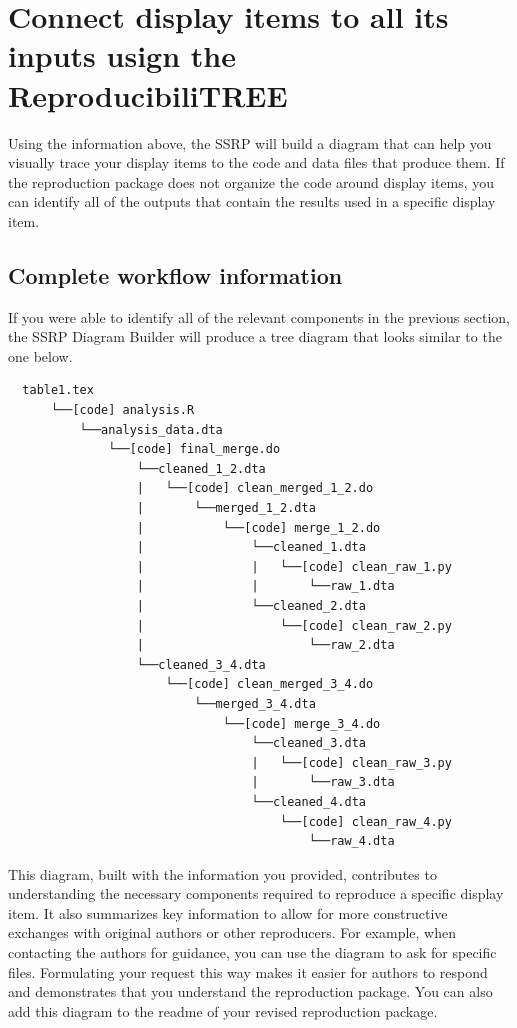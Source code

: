 \documentclass[
]{book}
\begin{document}
\hypertarget{diagram}{%
\section{Connect display items to all its inputs usign the ReproducibiliTREE}\label{diagram}}

Using the information above, the SSRP will build a diagram that can help you visually trace your display items to the code and data files that produce them. If the reproduction package does not organize the code around display items, you can identify all of the outputs that contain the results used in a specific display item.

\hypertarget{complete-tree}{%
\subsection{Complete workflow information}\label{complete-tree}}

If you were able to identify all of the relevant components in the previous section, the SSRP Diagram Builder will produce a tree diagram that looks similar to the one below.

\begin{verbatim}
  table1.tex
      └──[code] analysis.R
          └──analysis_data.dta
              └──[code] final_merge.do
                  └──cleaned_1_2.dta
                  |   └──[code] clean_merged_1_2.do
                  |       └──merged_1_2.dta
                  |           └──[code] merge_1_2.do
                  |               └──cleaned_1.dta
                  |               |   └──[code] clean_raw_1.py
                  |               |       └──raw_1.dta
                  |               └──cleaned_2.dta
                  |                   └──[code] clean_raw_2.py
                  |                       └──raw_2.dta
                  └──cleaned_3_4.dta
                      └──[code] clean_merged_3_4.do
                          └──merged_3_4.dta
                              └──[code] merge_3_4.do
                                  └──cleaned_3.dta
                                  |   └──[code] clean_raw_3.py
                                  |       └──raw_3.dta
                                  └──cleaned_4.dta
                                      └──[code] clean_raw_4.py
                                          └──raw_4.dta
\end{verbatim}

This diagram, built with the information you provided, contributes to understanding the necessary components required to reproduce a specific display item. It also summarizes key information to allow for more constructive exchanges with original authors or other reproducers. For example, when contacting the authors for guidance, you can use the diagram to ask for specific files. Formulating your request this way makes it easier for authors to respond and demonstrates that you understand the reproduction package. You can also add this diagram to the readme of your revised reproduction package.
\end{document}
